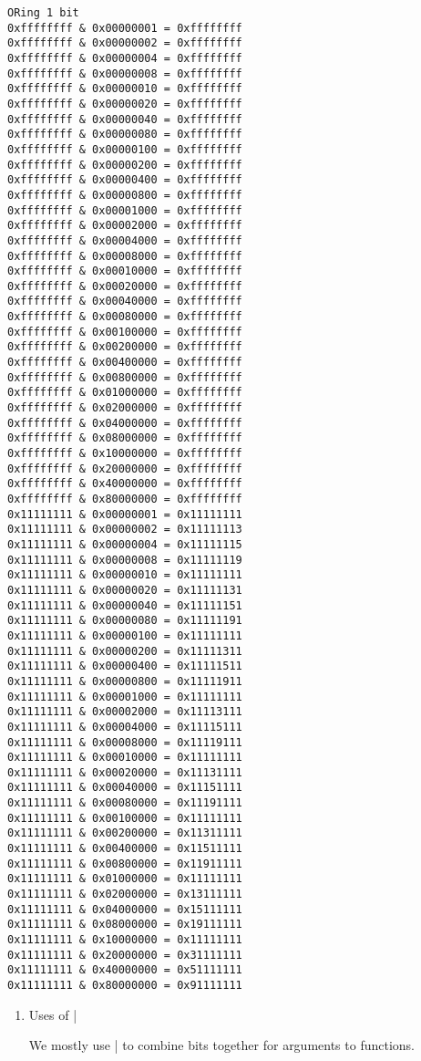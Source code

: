 \documentclass[11pt]{article}
\begin{document}
\begin{verbatim}
ORing 1 bit
0xffffffff & 0x00000001 = 0xffffffff
0xffffffff & 0x00000002 = 0xffffffff
0xffffffff & 0x00000004 = 0xffffffff
0xffffffff & 0x00000008 = 0xffffffff
0xffffffff & 0x00000010 = 0xffffffff
0xffffffff & 0x00000020 = 0xffffffff
0xffffffff & 0x00000040 = 0xffffffff
0xffffffff & 0x00000080 = 0xffffffff
0xffffffff & 0x00000100 = 0xffffffff
0xffffffff & 0x00000200 = 0xffffffff
0xffffffff & 0x00000400 = 0xffffffff
0xffffffff & 0x00000800 = 0xffffffff
0xffffffff & 0x00001000 = 0xffffffff
0xffffffff & 0x00002000 = 0xffffffff
0xffffffff & 0x00004000 = 0xffffffff
0xffffffff & 0x00008000 = 0xffffffff
0xffffffff & 0x00010000 = 0xffffffff
0xffffffff & 0x00020000 = 0xffffffff
0xffffffff & 0x00040000 = 0xffffffff
0xffffffff & 0x00080000 = 0xffffffff
0xffffffff & 0x00100000 = 0xffffffff
0xffffffff & 0x00200000 = 0xffffffff
0xffffffff & 0x00400000 = 0xffffffff
0xffffffff & 0x00800000 = 0xffffffff
0xffffffff & 0x01000000 = 0xffffffff
0xffffffff & 0x02000000 = 0xffffffff
0xffffffff & 0x04000000 = 0xffffffff
0xffffffff & 0x08000000 = 0xffffffff
0xffffffff & 0x10000000 = 0xffffffff
0xffffffff & 0x20000000 = 0xffffffff
0xffffffff & 0x40000000 = 0xffffffff
0xffffffff & 0x80000000 = 0xffffffff
0x11111111 & 0x00000001 = 0x11111111
0x11111111 & 0x00000002 = 0x11111113
0x11111111 & 0x00000004 = 0x11111115
0x11111111 & 0x00000008 = 0x11111119
0x11111111 & 0x00000010 = 0x11111111
0x11111111 & 0x00000020 = 0x11111131
0x11111111 & 0x00000040 = 0x11111151
0x11111111 & 0x00000080 = 0x11111191
0x11111111 & 0x00000100 = 0x11111111
0x11111111 & 0x00000200 = 0x11111311
0x11111111 & 0x00000400 = 0x11111511
0x11111111 & 0x00000800 = 0x11111911
0x11111111 & 0x00001000 = 0x11111111
0x11111111 & 0x00002000 = 0x11113111
0x11111111 & 0x00004000 = 0x11115111
0x11111111 & 0x00008000 = 0x11119111
0x11111111 & 0x00010000 = 0x11111111
0x11111111 & 0x00020000 = 0x11131111
0x11111111 & 0x00040000 = 0x11151111
0x11111111 & 0x00080000 = 0x11191111
0x11111111 & 0x00100000 = 0x11111111
0x11111111 & 0x00200000 = 0x11311111
0x11111111 & 0x00400000 = 0x11511111
0x11111111 & 0x00800000 = 0x11911111
0x11111111 & 0x01000000 = 0x11111111
0x11111111 & 0x02000000 = 0x13111111
0x11111111 & 0x04000000 = 0x15111111
0x11111111 & 0x08000000 = 0x19111111
0x11111111 & 0x10000000 = 0x11111111
0x11111111 & 0x20000000 = 0x31111111
0x11111111 & 0x40000000 = 0x51111111
0x11111111 & 0x80000000 = 0x91111111
\end{verbatim}

\begin{enumerate}
\item Uses of |
\label{sec:org52860f6}

We mostly use | to combine bits together for arguments to functions.
\end{enumerate}
\end{document}
